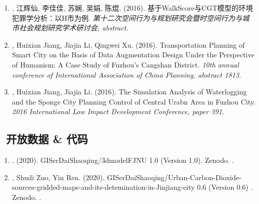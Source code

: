 \begin{enumerate}
\item
    {}, 江辉仙, 李佳佳, 苏娴, 吴娟, 陈焜. (2016).
    基于WalkScore与CGT模型的环境犯罪学分析：以H市为例.
    \textit{第十二次空间行为与规划研究会暨时空间行为与城市社会规划研究学术研讨会, abstract}.
\item
     \Shaoqing, Huixian Jiang, Jiajia Li, Qingwei Xu. (2016).
    Transportation Planning of Smart City on the Basis of Data Augmentation Design Under the Perspective of Humanism: A Case Study of Fuzhou's Cangshan District.
    \textit{10th annual conference of International Association of China Planning, abstract 1813}.
\item
    \Shaoqing, Huixian Jiang, Jiajia Li. (2016).
    The Simulation Analysis of Waterlogging and the Sponge City Planning Control of Central Urabn Area in Fuzhou City.
    \textit{2016 International Low Impact Development Conference, paper 391}.
\end{enumerate}

\subsection*{\texorpdfstring{\faBook\ 开放数据 \& 代码}{开放数据 \& 代码}}
\begin{enumerate}
\item
   \Shaoqing. (2020).
    GISerDaiShaoqing/3dmodelFJNU 1.0 (Version 1.0). Zenodo. 
    .
\item
   \Shaoqing, Shudi Zuo, Yin Ren. (2020).
    GISerDaiShaoqing/Urban-Carbon-Dioxide-sources-gridded-maps-and-its-detemination-in-Jinjiang-city 0.6 (Version 0.6) . Zenodo. 
    .
\end{enumerate}

